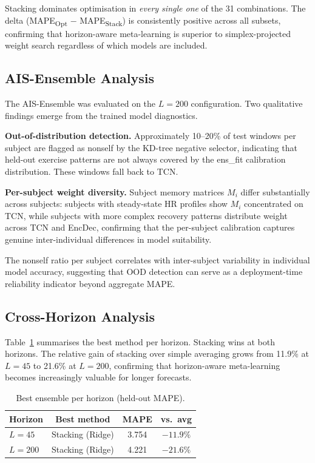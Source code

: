 \documentclass[conference]{IEEEtran}
\begin{document}
Stacking dominates optimisation in \textit{every single one} of the 31
combinations. The delta (MAPE\textsubscript{Opt} $-$ MAPE\textsubscript{Stack})
is consistently positive across all subsets, confirming that horizon-aware
meta-learning is superior to simplex-projected weight search regardless of
which models are included.

\subsection{AIS-Ensemble Analysis}
\label{ssec:ais}

The AIS-Ensemble was evaluated on the $L=200$ configuration. Two qualitative
findings emerge from the trained model diagnostics.

\textbf{Out-of-distribution detection.} Approximately 10--20\% of test windows
per subject are flagged as nonself by the KD-tree negative selector, indicating
that held-out exercise patterns are not always covered by the ens\_fit
calibration distribution. These windows fall back to TCN.

\textbf{Per-subject weight diversity.} Subject memory matrices $M_i$ differ
substantially across subjects: subjects with steady-state HR profiles show
$M_i$ concentrated on TCN, while subjects with more complex recovery patterns
distribute weight across TCN and EncDec, confirming that the per-subject
calibration captures genuine inter-individual differences in model suitability.

The nonself ratio per subject correlates with inter-subject variability in
individual model accuracy, suggesting that OOD detection can serve as a
deployment-time reliability indicator beyond aggregate MAPE.

\subsection{Cross-Horizon Analysis}
Table~\ref{tab:summary} summarises the best method per horizon. Stacking wins
at both horizons. The relative gain of stacking over simple averaging grows
from 11.9\% at $L=45$ to 21.6\% at $L=200$, confirming that horizon-aware
meta-learning becomes increasingly valuable for longer forecasts.

\begin{table}[t]
  \caption{Best ensemble per horizon (held-out MAPE).}
  \label{tab:summary}
  \centering
  \begin{tabular}{lccc}
    \toprule
    Horizon & Best method & MAPE & vs.\ avg \\
    \midrule
    $L=45$  & Stacking (Ridge) & 3.754 & $-11.9\%$ \\
    $L=200$ & Stacking (Ridge) & 4.221 & $-21.6\%$ \\
    \bottomrule
  \end{tabular}
\end{table}
\end{document}
